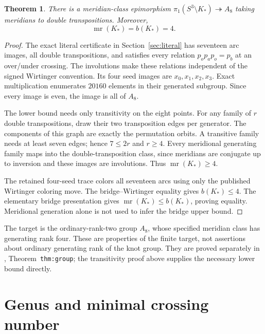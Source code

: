 \documentclass[11pt]{article}
\newtheorem{theorem}{Theorem}
\newcommand{\mr}{\operatorname{mr}}
\begin{document}
\begin{theorem}\label{thm:sharp}
There is a meridian-class epimorphism
$\pi_1(S^3\setminus K_*)\twoheadrightarrow A_8$ taking meridians to
double transpositions. Moreover,
\[
                         \mr(K_*)=b(K_*)=4.
\]
\end{theorem}
\begin{proof}
The exact literal certificate in Section~\ref{sec:literal} has seventeen
arc images, all double transpositions, and satisfies every relation
$p_op_ap_o=p_b$ at an over/under crossing. The involutions make these
relations independent of the signed Wirtinger convention. Its four
seed images are $x_0,x_1,x_2,x_3$. Exact multiplication enumerates
$20160$ elements in their generated subgroup. Since every image is
even, the image is all of $A_8$.

The lower bound needs only transitivity on the eight points.
For any family of $r$ double transpositions, draw their two
transposition edges per generator. The components of this graph are
exactly the permutation orbits. A transitive family needs at least
seven edges; hence $7\le2r$ and $r\ge4$. Every meridional generating
family maps into the double-transposition class, since meridians are
conjugate up to inversion and these images are involutions.
Thus $\mr(K_*)\ge4$.

The retained four-seed trace colors all seventeen arcs using only the
published Wirtinger coloring move. The bridge--Wirtinger equality
\cite[Definition~1.2 and Theorem~1.3]{bkvv} gives $b(K_*)\le4$.
The elementary bridge presentation gives $\mr(K_*)\le b(K_*)$,
proving equality. Meridional generation alone is not used to infer
the bridge upper bound.
\end{proof}

The target is the ordinary-rank-two group $A_8$, whose specified
meridian class has generating rank four. These are properties of the
finite target, not assertions about ordinary generating rank of the
knot group. They are proved separately in
, Theorem~\texttt{thm:group}; the
transitivity proof above supplies the necessary lower bound directly.

\section{Genus and minimal crossing number}
\end{document}
